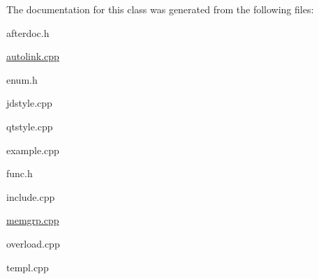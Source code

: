 The documentation for this class was generated from the following files\-:\begin{DoxyCompactItemize}
\item 
afterdoc.\-h\item 
\hyperlink{autolink_8cpp}{autolink.\-cpp}\item 
enum.\-h\item 
jdstyle.\-cpp\item 
qtstyle.\-cpp\item 
example.\-cpp\item 
func.\-h\item 
include.\-cpp\item 
\hyperlink{memgrp_8cpp}{memgrp.\-cpp}\item 
overload.\-cpp\item 
templ.\-cpp\end{DoxyCompactItemize}
